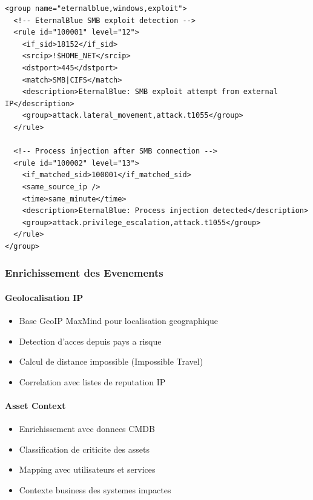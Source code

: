 \begin{lstlisting}[style=xmlstyle,caption=Exemple de regle Wazuh pour detection EternalBlue]
<group name="eternalblue,windows,exploit">
  <!-- EternalBlue SMB exploit detection -->
  <rule id="100001" level="12">
    <if_sid>18152</if_sid>
    <srcip>!$HOME_NET</srcip>
    <dstport>445</dstport>
    <match>SMB|CIFS</match>
    <description>EternalBlue: SMB exploit attempt from external IP</description>
    <group>attack.lateral_movement,attack.t1055</group>
  </rule>
  
  <!-- Process injection after SMB connection -->
  <rule id="100002" level="13">
    <if_matched_sid>100001</if_matched_sid>
    <same_source_ip />
    <time>same_minute</time>
    <description>EternalBlue: Process injection detected</description>
    <group>attack.privilege_escalation,attack.t1055</group>
  </rule>
</group>
\end{lstlisting}

\subsubsection{Enrichissement des Evenements}

\paragraph{Geolocalisation IP}
\begin{itemize}
    \item Base GeoIP MaxMind pour localisation geographique
    \item Detection d'acces depuis pays a risque
    \item Calcul de distance impossible (Impossible Travel)
    \item Correlation avec listes de reputation IP
\end{itemize}

\paragraph{Asset Context}
\begin{itemize}
    \item Enrichissement avec donnees CMDB
    \item Classification de criticite des assets
    \item Mapping avec utilisateurs et services
    \item Contexte business des systemes impactes
\end{itemize}


